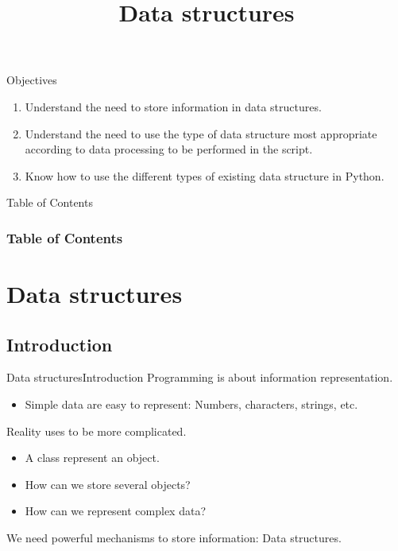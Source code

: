 \documentclass[10pt,compress]{beamer} %
\title[Data structures]{Data structures}
\author{}
\institute{\asignatura}
\date{}
\begin{document}
{\titlepageBlue
    \begin{frame}
        \titlepage
    \end{frame}
}

\begin{frame}[plain]{}
	\begin{block}{Objectives}
		\begin{enumerate}
		\item Understand the need to store information in data structures.
		\item Understand the need to use the type of data structure most appropriate according to data processing to be performed in the script.
		\item Know how to use the different types of existing data structure in Python.
		\end{enumerate}
	\end{block}
\end{frame}

{
\begin{frame}[shrink]{Table of Contents}
 \frametitle{Table of Contents}
 \tableofcontents
\end{frame}
}

\section{Data structures}
\subsection{Introduction}
\begin{frame}{Data structures}{Introduction}
	Programming is about information representation.
	\begin{itemize}
		\item Simple data are easy to represent: Numbers, characters, strings, etc.
	\end{itemize}
	Reality uses to be more complicated.
	\begin{itemize}
		\item A class represent an object.
		\item How can we store several objects?
		\item How can we represent complex data?
	\end{itemize}
	We need powerful mechanisms to store information: Data structures.
\end{frame}
\end{document}
